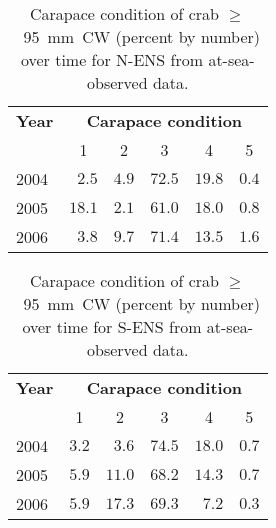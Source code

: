\documentclass[11pt]{article}
\begin{document}
\begin{table}
\caption{Carapace condition of crab $\geq$~95~mm~CW (percent by number) over time for N-ENS from at-sea-observed data.}
\label{table.CC.large.north.obs}
\begin{center}
\begin{tabular}{lrrrrr}
\hline \hline
\multicolumn{1}{l}{\bfseries Year}&
\multicolumn{5}{c}{\bfseries Carapace condition}
\\ \cline{2-6}
\multicolumn{1}{l}{}&
\multicolumn{1}{c}{1}&
\multicolumn{1}{c}{2}&
\multicolumn{1}{c}{3}&
\multicolumn{1}{c}{4}&
\multicolumn{1}{c}{5}
\\ \hline
2004 &$  2.5 $&$4.9 $&$ 72.5 $&$ 19.8 $&$ 0.4 $\\
2005 &$ 18.1 $&$2.1 $&$ 61.0 $&$ 18.0 $&$ 0.8 $\\
2006 &$  3.8 $&$9.7 $&$ 71.4 $&$ 13.5 $&$ 1.6 $\\
\hline
\end{tabular}
\end{center}
\end{table}


\begin{table}
\caption{Carapace condition of crab $\geq$~95~mm~CW (percent by number) over time for S-ENS from at-sea-observed data.}
\label{table.CC.large.south.obs}
\begin{center}
\begin{tabular}{lrrrrr}
\hline \hline
\multicolumn{1}{l}{\bfseries Year}&
\multicolumn{5}{c}{\bfseries Carapace condition}
\\ \cline{2-6}
\multicolumn{1}{l}{}&
\multicolumn{1}{c}{1}&
\multicolumn{1}{c}{2}&
\multicolumn{1}{c}{3}&
\multicolumn{1}{c}{4}&
\multicolumn{1}{c}{5}
\\ \hline
2004 &$ 3.2 $&$  3.6 $&$ 74.5 $&$ 18.0 $&$ 0.7 $\\
2005 &$ 5.9 $&$ 11.0 $&$ 68.2 $&$ 14.3 $&$ 0.7 $\\
2006 &$ 5.9 $&$ 17.3 $&$ 69.3 $&$  7.2 $&$ 0.3 $\\
\hline
\end{tabular}
\end{center}
\end{table}
\end{document}
